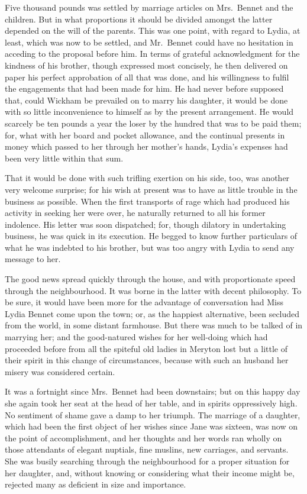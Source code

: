 \documentclass[12pt,english]{book}
\begin{document}
Five thousand pounds was settled by marriage articles on Mrs.\ Bennet
and the children. But in what proportions it should be divided amongst
the latter depended on the will of the parents. This was one point,
with regard to Lydia, at least, which was now to be settled, and Mr.\ Bennet
could have no hesitation in acceding to the proposal before him. In
terms of grateful acknowledgment for the kindness of his brother,
though expressed most concisely, he then delivered on paper his perfect
approbation of all that was done, and his willingness to fulfil the
engagements that had been made for him. He had never before supposed
that, could Wickham be prevailed on to marry his daughter, it would
be done with so little inconvenience to himself as by the present
arrangement. He would scarcely be ten pounds a year the loser by the
hundred that was to be paid them; for, what with her board and pocket
allowance, and the continual presents in money which passed to her
through her mother's hands, Lydia's expenses had been very little
within that sum.

That it would be done with such trifling exertion on his side, too,
was another very welcome surprise; for his wish at present was to
have as little trouble in the business as possible. When the first
transports of rage which had produced his activity in seeking her
were over, he naturally returned to all his former indolence. His
letter was soon dispatched; for, though dilatory in undertaking business,
he was quick in its execution. He begged to know further particulars
of what he was indebted to his brother, but was too angry with Lydia
to send any message to her.

The good news spread quickly through the house, and with proportionate
speed through the neighbourhood. It was borne in the latter with decent
philosophy. To be sure, it would have been more for the advantage
of conversation had Miss Lydia Bennet come upon the town; or, as the
happiest alternative, been secluded from the world, in some distant
farmhouse. But there was much to be talked of in marrying her; and
the good-natured wishes for her well-doing which had proceeded before
from all the spiteful old ladies in Meryton lost but a little of their
spirit in this change of circumstances, because with such an husband
her misery was considered certain.

It was a fortnight since Mrs.\ Bennet had been downstairs; but on
this happy day she again took her seat at the head of her table, and
in spirits oppressively high. No sentiment of shame gave a damp to
her triumph. The marriage of a daughter, which had been the first
object of her wishes since Jane was sixteen, was now on the point
of accomplishment, and her thoughts and her words ran wholly on those
attendants of elegant nuptials, fine muslins, new carriages, and servants.
She was busily searching through the neighbourhood for a proper situation
for her daughter, and, without knowing or considering what their income
might be, rejected many as deficient in size and importance.
\end{document}
